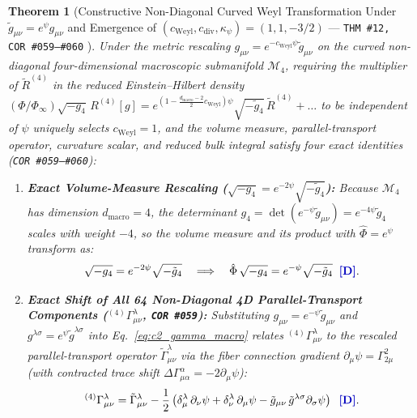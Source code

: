 \documentclass[11pt,a4paper]{article}
\newcommand{\catD}{\text{\textbf{\textcolor{blue!75!black}{[D]}}}}
\theoremstyle{definition}
\theoremstyle{plain}
\newtheorem{theorem}[axiom]{Theorem}
\theoremstyle{remark}
\begin{document}
\begin{theorem}[Constructive Non-Diagonal Curved Weyl Transformation Under $\tilde{g}_{\mu\nu} = e^{\psi}g_{\mu\nu}$ and Emergence of $(c_{\mathrm{Weyl}}, c_{\mathrm{div}}, \kappa_\psi) = (1, 1, -3/2)$ --- \texttt{THM~\#12, COR~\#059--\#060} \catD]\label{thm:c3_einstein_frame_reduction}\label{thm:c3_weyl_reduction}
Under the metric rescaling $g_{\mu\nu} = e^{-c_{\mathrm{Weyl}}\psi}\tilde{g}_{\mu\nu}$ on the curved non-diagonal four-dimensional macroscopic submanifold $\mathcal{M}_4$, requiring the multiplier of $\tilde{R}^{(4)}$ in the reduced Einstein--Hilbert density $(\Phi/\Phi_\infty)\sqrt{-g_4}\,R^{(4)}[g] = e^{(1 - \frac{d_{\mathrm{macro}}-2}{2}c_{\mathrm{Weyl}})\psi}\sqrt{-\tilde{g}_4}\,\tilde{R}^{(4)} + \dots$ to be independent of $\psi$ uniquely selects $c_{\mathrm{Weyl}} = 1$, and the volume measure, parallel-transport operator, curvature scalar, and reduced bulk integral satisfy four exact identities (\texttt{COR~\#059--\#060}):
\begin{enumerate}[label=(\roman*)]
  \item \textbf{Exact Volume-Measure Rescaling ($\sqrt{-g_4} = e^{-2\psi}\sqrt{-\tilde{g}_4}$):}
  Because $\mathcal{M}_4$ has dimension $d_{\mathrm{macro}} = 4$, the determinant $g_4 = \det(e^{-\psi}\tilde{g}_{\mu\nu}) = e^{-4\psi}\tilde{g}_4$ scales with weight $-4$, so the volume measure and its product with $\hat{\Phi} = e^\psi$ transform as:
  \begin{equation}\label{eq:c3_volume_rescaling}
  \sqrt{-g_4} = e^{-2\psi}\sqrt{-\tilde{g}_4} \quad \Longrightarrow \quad
  \hat{\Phi}\,\sqrt{-g_4} = e^{-\psi}\sqrt{-\tilde{g}_4} \;\;\catD.
  \end{equation}

  \item \textbf{Exact Shift of All 64 Non-Diagonal 4D Parallel-Transport Components (${}^{(4)}\Gamma^\lambda_{\mu\nu}$, \texttt{COR~\#059}):}
  Substituting $g_{\mu\nu} = e^{-\psi}\tilde{g}_{\mu\nu}$ and $g^{\lambda\sigma} = e^{\psi}\tilde{g}^{\lambda\sigma}$ into Eq.~\eqref{eq:c2_gamma_macro} relates ${}^{(4)}\Gamma^\lambda_{\mu\nu}$ to the rescaled parallel-transport operator $\tilde{\Gamma}^\lambda_{\mu\nu}$ via the fiber connection gradient $\partial_\mu\psi = \Gamma^2_{2\mu}$ (with contracted trace shift $\Delta\Gamma^\alpha_{\mu\alpha} = -2\partial_\mu\psi$):
  \begin{equation}\label{eq:c3_gamma_rescaling}
  {}^{(4)}\Gamma^\lambda_{\mu\nu} = \tilde{\Gamma}^\lambda_{\mu\nu} - \frac{1}{2}\left(\delta^\lambda_\mu\,\partial_\nu\psi + \delta^\lambda_\nu\,\partial_\mu\psi - \tilde{g}_{\mu\nu}\,\tilde{g}^{\lambda\sigma}\partial_\sigma\psi\right) \;\;\catD.
  \end{equation}


\end{enumerate}
\end{theorem}
\end{document}
